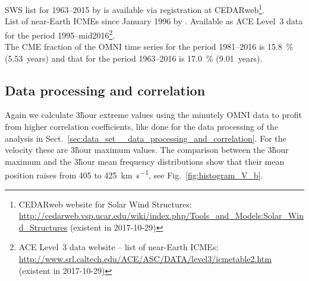 SWS list for 1963--2015 by \citep{Richardson2000,Richardson2012} is available via registration at CEDARweb\footnote{CEDARweb website for Solar Wind Structures: \url{http://cedarweb.vsp.ucar.edu/wiki/index.php/Tools_and_Models:Solar_Wind_Structures} (existent in 2017-10-29)}.\\
List of near-Earth ICMEs since January 1996 by \citet{Cane2003,Richardson2010}. Available as ACE Level~3 data for the period 1995--mid2016\footnote{ACE Level~3 data website -- list of near-Earth ICMEs: \url{http://www.srl.caltech.edu/ACE/ASC/DATA/level3/icmetable2.htm} (existent in 2017-10-29)}.\\

The CME fraction of the OMNI time series for the period 1981--2016 is \SI{15.8}{\%} (5.53~years) and that for the period 1963--2016 is \SI{17.0}{\%} (9.01~years).\\



\subsection{Data processing and correlation}
Again we calculate 3\~hour extreme values using the minutely OMNI data to profit from higher correlation coefficients, like done for the data processing of the \vBz{} analysis in Sect.~\ref{sec:data_set__data_processing_and_correlation}. For the velocity these are 3\~hour maximum values. The comparison between the 3\~hour maximum and the 3\~hour mean frequency distributions show that their mean position raises from 405 to \SI{425}{\km\per\s}, see Fig.~\ref{fig:histogram_V_b}.\\
\begin{figure}
\end{figure}

